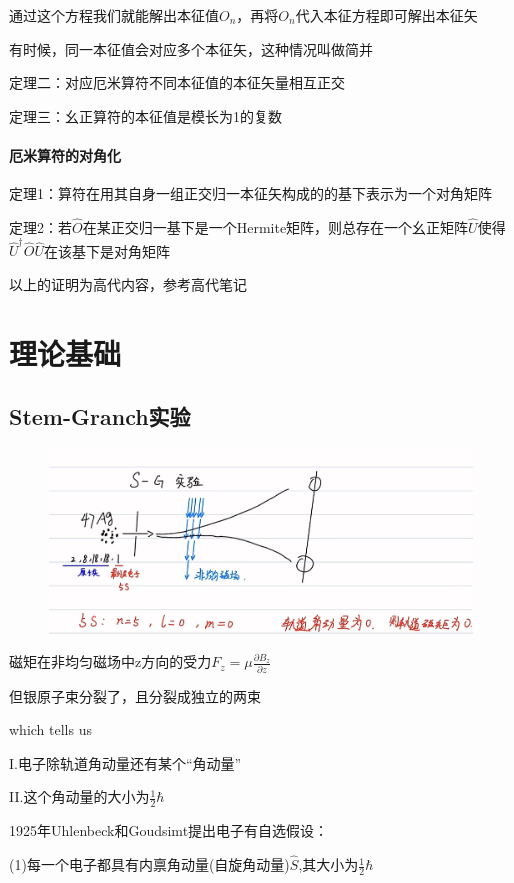\documentclass[lang=cn,10pt]{elegantbook}
\begin{document}
通过这个方程我们就能解出本征值$O_n$，再将$O_n$代入本征方程即可解出本征矢

有时候，同一本征值会对应多个本征矢，这种情况叫做简并

定理二：对应厄米算符不同本征值的本征矢量相互正交

定理三：幺正算符的本征值是模长为1的复数

\subsubsection{厄米算符的对角化}
定理1：算符在用其自身一组正交归一本征矢构成的的基下表示为一个对角矩阵

定理2：若$\hat{O}$在某正交归一基下是一个Hermite矩阵，则总存在一个幺正矩阵$\hat{U}
$使得$\hat{U}^{\dagger}\hat{O}\hat{U}$在该基下是对角矩阵

以上的证明为高代内容，参考高代笔记

\chapter{理论基础}
\section{Stem-Granch实验}
\begin{figure}[H]
	\centering
	\includegraphics[width=0.9\linewidth]{figure/screenshot0015}
\end{figure}
磁矩在非均匀磁场中z方向的受力$F_z=\mu\frac{\partial B_z}{\partial z}$

但银原子束分裂了，且分裂成独立的两束

which tells us

I.电子除轨道角动量还有某个“角动量”

II.这个角动量的大小为$\frac{1}{2}\hbar$

1925年Uhlenbeck和Goudsimt提出电子有自选假设：

(1)每一个电子都具有内禀角动量(自旋角动量)$\hat{S}$,其大小为$\frac{1}{2}\hbar$
\end{document}
